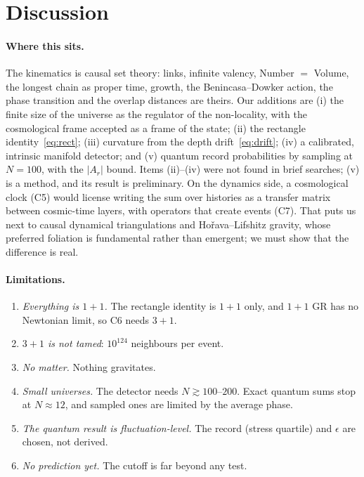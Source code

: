 \documentclass[11pt,a4paper]{article}
\begin{document}
\section{Discussion}
\paragraph{Where this sits.} The kinematics is causal set theory: links, infinite valency, Number $=$ Volume, the longest chain as proper time, growth, the Benincasa--Dowker action, the phase transition and the overlap distances are theirs. Our additions are (i) the finite size of the universe as the regulator of the non-locality, with the cosmological frame accepted as a frame of the state; (ii) the rectangle identity~\eqref{eq:rect}; (iii) curvature from the depth drift~\eqref{eq:drift}; (iv) a calibrated, intrinsic manifold detector; and (v) quantum record probabilities by sampling at $N=100$, with the $|A_r|$ bound. Items (ii)--(iv) were not found in brief searches; (v) is a method, and its result is preliminary. On the dynamics side, a cosmological clock (C5) would license writing the sum over histories as a transfer matrix between cosmic-time layers, with operators that create events (C7). That puts us next to causal dynamical triangulations and Hořava--Lifshitz gravity, whose preferred foliation is fundamental rather than emergent; we must show that the difference is real.

\paragraph{Limitations.}
\begin{enumerate}[leftmargin=*,itemsep=1pt]
\item \emph{Everything is $1+1$.} The rectangle identity is $1+1$ only, and $1+1$ GR has no Newtonian limit, so C6 needs $3+1$.
\item \emph{$3+1$ is not tamed}: $10^{124}$ neighbours per event.
\item \emph{No matter.} Nothing gravitates.
\item \emph{Small universes.} The detector needs $N\gtrsim100$--$200$. Exact quantum sums stop at $N\approx12$, and sampled ones are limited by the average phase.
\item \emph{The quantum result is fluctuation-level.} The record (stress quartile) and $\epsilon$ are chosen, not derived.
\item \emph{No prediction yet.} The cutoff is far beyond any test.
\end{enumerate}
\end{document}
